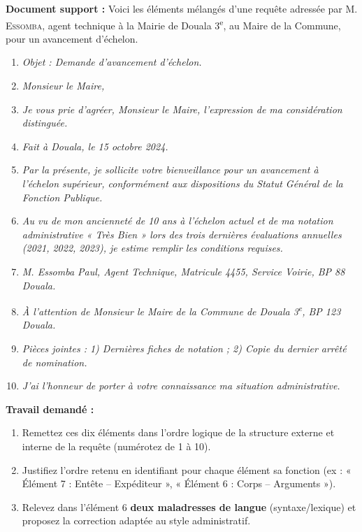 \documentclass[11pt]{article}
\begin{document}
\begin{exercice}
\textbf{Document support :} Voici les éléments mélangés d'une requête adressée par M. \textsc{Essomba}, agent technique à la Mairie de Douala 3\textsuperscript{e}, au Maire de la Commune, pour un avancement d'échelon.

\begin{enumerate}
    \item \textit{Objet : Demande d'avancement d'échelon.}
    \item \textit{Monsieur le Maire,}
    \item \textit{Je vous prie d'agréer, Monsieur le Maire, l'expression de ma considération distinguée.}
    \item \textit{Fait à Douala, le 15 octobre 2024.}
    \item \textit{Par la présente, je sollicite votre bienveillance pour un avancement à l'échelon supérieur, conformément aux dispositions du Statut Général de la Fonction Publique.}
    \item \textit{Au vu de mon ancienneté de 10 ans à l'échelon actuel et de ma notation administrative « Très Bien » lors des trois dernières évaluations annuelles (2021, 2022, 2023), je estime remplir les conditions requises.}
    \item \textit{M. Essomba Paul, Agent Technique, Matricule 4455, Service Voirie, BP 88 Douala.}
    \item \textit{À l'attention de Monsieur le Maire de la Commune de Douala 3\textsuperscript{e}, BP 123 Douala.}
    \item \textit{Pièces jointes : 1) Dernières fiches de notation ; 2) Copie du dernier arrêté de nomination.}
    \item \textit{J'ai l'honneur de porter à votre connaissance ma situation administrative.}
\end{enumerate}

\textbf{Travail demandé :}
\begin{enumerate}
    \item Remettez ces dix éléments dans l'ordre logique de la structure externe et interne de la requête (numérotez de 1 à 10).
    \item Justifiez l'ordre retenu en identifiant pour chaque élément sa fonction (ex : « Élément 7 : Entête -- Expéditeur », « Élément 6 : Corps -- Arguments »).
    \item Relevez dans l'élément 6 \textbf{deux maladresses de langue} (syntaxe/lexique) et proposez la correction adaptée au style administratif.
\end{enumerate}
\end{exercice}
\end{document}
